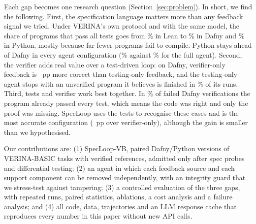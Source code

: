 Each gap becomes one research question (Section~\ref{sec:problem}). In short, we find the following. First, the specification language matters more than any feedback signal we tried. Under VERINA's own protocol and with the same model, the share of programs that pass all tests goes from \% in Lean to \% in Dafny and \% in Python, mostly because far fewer programs fail to compile. Python stays ahead of Dafny in every agent configuration (\% against \% for the full agent). Second, the verifier adds real value over a test-driven loop: on Dafny, verifier-only feedback is ~pp more correct than testing-only feedback, and the testing-only agent stops with an unverified program it believes is finished in \% of its runs. Third, tests and verifier work best together. In \% of failed Dafny verifications the program already passed every test, which means the code was right and only the proof was missing. SpecLoop uses the tests to recognise these cases and is the most accurate configuration (~pp over verifier-only), although the gain is smaller than we hypothesised.

Our contributions are: (1) SpecLoop-VB, \NTASKS{} paired Dafny/Python versions of VERINA-BASIC tasks with verified references, admitted only after spec probes and differential testing; (2) an agent in which each feedback source and each support component can be removed independently, with an integrity guard that we stress-test against tampering; (3) a controlled evaluation of the three gaps, with repeated runs, paired statistics, ablations, a cost analysis and a failure analysis; and (4) all code, data, trajectories and an LLM response cache that reproduces every number in this paper without new API calls.
